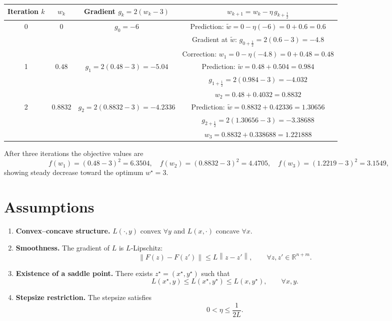 \documentclass{article}
\newcommand{\R}{\mathbb{R}}
\newcommand{\norm}[1]{\left\lVert #1 \right\rVert}
\begin{document}
\begin{center}
\begin{tabular}{c|c|c|c}
Iteration $k$ & $w_k$ & Gradient $g_k=2(w_k-3)$ & $w_{k+1}=w_k-\eta\,g_{k+\frac12}$\\ \hline
0 & $0$ & $g_0= -6$ & Prediction: $\tilde w=0-\eta(-6)=0+0.6=0.6$\\
  &     &                     & Gradient at $\tilde w$: $g_{0+\frac12}=2(0.6-3)=-4.8$\\
  &     &                     & Correction: $w_1=0-\eta(-4.8)=0+0.48=0.48$\\ \hline
1 & $0.48$ & $g_1=2(0.48-3)=-5.04$ & Prediction: $\tilde w=0.48+0.504=0.984$\\
  &       &                         & $g_{1+\frac12}=2(0.984-3)=-4.032$\\
  &       &                         & $w_2=0.48+0.4032=0.8832$\\ \hline
2 & $0.8832$ & $g_2=2(0.8832-3)=-4.2336$ & Prediction: $\tilde w=0.8832+0.42336=1.30656$\\
  &          &                               & $g_{2+\frac12}=2(1.30656-3)=-3.38688$\\
  &          &                               & $w_3=0.8832+0.338688=1.221888$\\
\end{tabular}
\end{center}
After three iterations the objective values are
\[
f(w_1)= (0.48-3)^2=6.3504,\quad 
f(w_2)= (0.8832-3)^2=4.4705,\quad 
f(w_3)= (1.2219-3)^2=3.1549,
\]
showing steady decrease toward the optimum $w^\star=3$.

\newpage
\section*{Assumptions}
\begin{enumerate}
\item \textbf{Convex–concave structure.} $L(\cdot ,y)$ convex $\forall y$ and $L(x,\cdot )$ concave $\forall x$.
\item \textbf{Smoothness.} The gradient of $L$ is $L$‑Lipschitz:
\[
\norm{F(z)-F(z')}\le L\norm{z-z'},\qquad\forall z,z'\in\R^{n+m}.
\tag{A1}
\]
\item \textbf{Existence of a saddle point.} There exists $z^\star=(x^\star,y^\star)$ such that
\[
L(x^\star,y)\le L(x^\star,y^\star)\le L(x,y^\star),\qquad\forall x,y.
\tag{A2}
\]
\item \textbf{Stepsize restriction.} The stepsize satisfies
\[
0<\eta\le \frac{1}{2L}.
\tag{A3}
\]
\end{enumerate}
\end{document}
